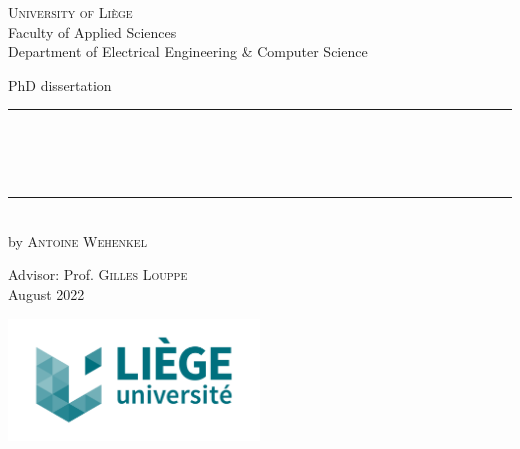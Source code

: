 
\begin{titlepage}
	\begin{addmargin}[-1cm]{-3cm}
    \begin{center}
        \large
        {\Large \textsc{University of Li{\`e}ge}}\\[1ex]
        Faculty of Applied Sciences\\
        Department of Electrical Engineering \& Computer Science\\

        \vfill

        PhD dissertation\\ \vskip1cm
        \rule{14cm}{0.4pt}\\ \bigskip
        \begingroup
            \Large
            \color{Maroon}\spacedallcaps{\myTitle} \\ \bigskip
        \endgroup
        \spacedlowsmallcaps{\mySubtitle} \\ \bigskip
        \rule{14cm}{0.4pt}\\ \vskip1cm
        by \textsc{Antoine Wehenkel}

        \vfill
        \vfill
        \vfill

        \hfill Advisor: Prof. \textsc{Gilles Louppe}\\
        \hfill August 2022
    \end{center}
    \vspace{-2.5cm}\includegraphics[width=0.5\textwidth]{figures/blason.pdf}
  \end{addmargin}
\end{titlepage}
